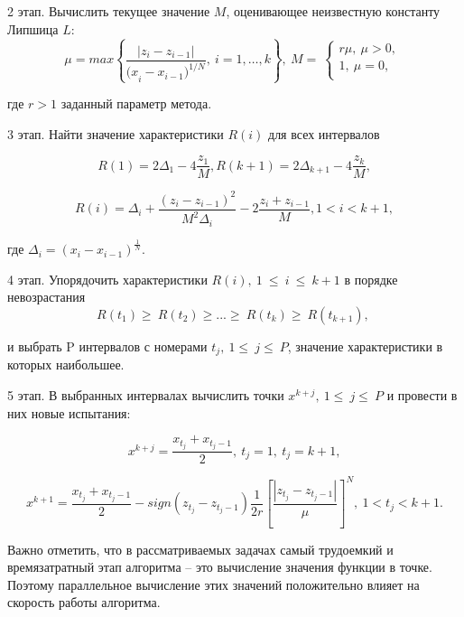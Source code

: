 \documentclass[10pt,a4paper]{book}
\begin{document}
2 этап. Вычислить текущее значение $M$, оценивающее неизвестную константу Липшица $L$:
 \begin{equation}
\label{agp2_mu}
	\mu=max\left\{\frac{|z_i-z_{i-1}|}{{{(x}_i-x_{i-1})}^{1/N}},\ i=1,\ldots,k\right\},\ M=\ \left\{\begin{matrix}r\mu,\ \mu>0,\\1,\ \mu=0,\\\end{matrix}\right.\
		\end{equation}

   где $r>1$ заданный параметр метода.
   
3 этап. Найти значение характеристики $R(i)$ для всех интервалов

\begin{equation}
\label{agp3_R1}
R(1)=2\Delta_1-4\dfrac{z_1}{M},R(k+1)=2\Delta_{k+1}-4\dfrac{z_k}{M},
\end{equation}

\begin{equation}
\label{agp3_Ri}
R(i)=\Delta_i+\dfrac{(z_i-z_{i-1})^2}{M^2\Delta_i}-2\dfrac{z_i+z_{i-1}}{M},1<i<k+1,
\end{equation}

   где \(\Delta_i=(x_i-x_{i-1})^\frac{1}{N}\).
   
4 этап.  Упорядочить характеристики $R\left(i\right),\ 1\ \le\ i\ \le\ k+1$ в порядке невозрастания 
\begin{equation}
\label{agp4_R_sort}
	R\left(t_1\right)\geq\ R\left(t_2\right)\geq...\geq\ R\left(t_k\right)\geq\ R(t_{k+1}),\ 
\end{equation}	
	
и выбрать P интервалов с номерами $t_j,\ 1\le\ j\le\ P$, значение характеристики в которых наибольшее.

5 этап. В выбранных интервалах вычислить точки $x^{k+j},\ 1\le\ j\le\ P$ и провести в них новые испытания:

\begin{equation}
\label{agp5_x1}
	x^{k+j}=\frac{x_{t_j}+x_{t_j-1}}{2},\ t_j=1,\ t_j=k+1,
\end{equation}	
	
\begin{equation}
\label{agp4_xi}	
	x^{k+1}=\frac{x_{t_j}+x_{t_j-1}}{2}-sign\left(z_{t_j}-z_{t_j-1}\right)\frac{1}{2r}\left[\frac{\left|z_{t_j}-z_{t_j-1}\right|}{\mu}\right]^N,\ 1<t_j<k+1.
\end{equation}	

Важно отметить, что в рассматриваемых задачах самый трудоемкий и времязатратный этап алгоритма – это вычисление значения функции в точке. Поэтому параллельное вычисление этих значений положительно влияет на скорость работы алгоритма.
\end{document}
